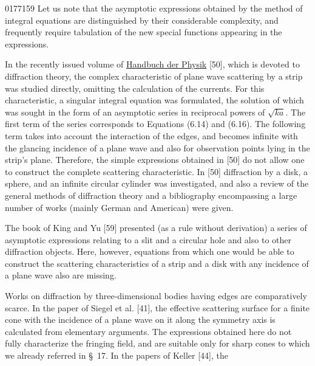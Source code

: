 \begin{scanpage}{0177}{159}
Let us note that the asymptotic expressions obtained by the method of integral equations are distinguished by their considerable complexity, and frequently require tabulation of the new special functions appearing in the expressions.

In the recently issued volume of \underline{Handbuch der Physik} [50], which is devoted to diffraction theory, the complex characteristic of plane wave scattering by a strip was studied directly, omitting the calculation of the currents. For this characteristic, a singular integral equation was formulated, the solution of which was sought in the form of an asymptotic series in reciprocal powers of $\sqrt{ka}$. The first term of the series corresponds to Equations (6.14) and (6.16). The following term takes into account the interaction of the edges, and becomes infinite with the glancing incidence of a plane wave and also for observation points lying in the strip's plane. Therefore, the simple expressions obtained in [50] do not allow one to construct the complete scattering characteristic. In [50] diffraction by a disk, a sphere, and an infinite circular cylinder was investigated, and also a review of the general methods of diffraction theory and a bibliography encompassing a large number of works (mainly German and American) were given.

The book of King and Yu [59] presented (as a rule without derivation) a series of asymptotic expressions relating to a slit and a circular hole and also to other diffraction objects. Here, however, equations from which one would be able to construct the scattering characteristics of a strip and a disk with any incidence of a plane wave also are missing.

Works on diffraction by three-dimensional bodies having edges are comparatively scarce. In the paper of Siegel et al. [41], the effective scattering surface for a finite cone with the incidence of a plane wave on it along the symmetry axis is calculated from elementary arguments. The expressions obtained here do not fully characterize the fringing field, and are suitable only for sharp cones to which we already referred in \S~17. In the papers of Keller [44], the
\end{scanpage}
